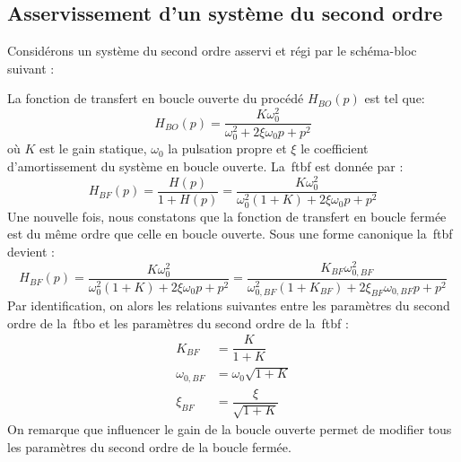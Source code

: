 \subsection{Asservissement d'un système du second ordre}
Considérons un système du second ordre asservi et régi par le schéma-bloc 
suivant :
\begin{center}
    
\end{center}
La fonction de transfert en boucle ouverte du procédé $H_{BO}(p)$ est tel que:
\[
H_{BO}(p)=\dfrac{K\omega^2_0}{\omega^2_0+2\xi\omega_0p+p^2}
\]
où $K$ est le gain statique, $\omega_0$ la pulsation propre et $\xi$ 
le coefficient d'amortissement du système en boucle ouverte.
La~\gls{ftbf} est donnée par :
\[
H_{BF}(p)=\dfrac{H(p)}{1+H(p)}=
\dfrac{K\omega^2_0}{\omega^2_0(1+K)+2\xi\omega_0p+p^2}
\]
Une nouvelle fois, nous constatons que la fonction de transfert en 
boucle fermée est du même ordre que celle en boucle ouverte. 
Sous une forme canonique la~\gls{ftbf} devient :
\[
H_{BF}(p)=\dfrac{K\omega^2_0}{\omega^2_0(1+K)+2\xi\omega_0p+p^2}=
\dfrac{K_{BF}\omega^2_{0,BF}}{\omega^2_{0,BF}(1+K_{BF})+
2\xi_{BF}\omega_{0,BF}p+p^2}
\]
Par identification, on alors les relations suivantes entre 
les paramètres du second ordre de la~\gls{ftbo} et les paramètres du 
second ordre de la~\gls{ftbf} :
\begin{align*}
    K_{BF}       &=\dfrac{K}{1+K}         \\
    \omega_{0,BF}&=\omega_0\sqrt{1+K}     \\
    \xi_{BF}     &=\dfrac{\xi}{\sqrt{1+K}}
\end{align*}
On remarque que influencer le gain de la boucle ouverte permet de modifier
tous les paramètres du second ordre de la boucle fermée.
\clearpage
